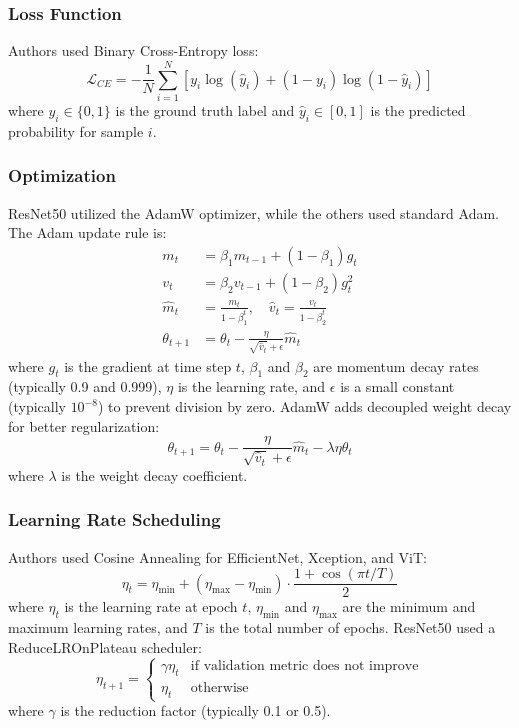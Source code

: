 \documentclass[runningheads]{llncs}
\begin{document}
\subsubsection{Loss Function}
Authors used Binary Cross-Entropy loss:
\begin{equation}
\mathcal{L}_{CE} = -\frac{1}{N}\sum_{i=1}^{N}\left[y_i \log(\hat{y}_i) + (1-y_i)\log(1-\hat{y}_i)\right]
\label{eq:cross_entropy}
\end{equation}
where $y_i \in \{0,1\}$ is the ground truth label and $\hat{y}_i \in [0,1]$ is the predicted probability for sample $i$.

\subsubsection{Optimization}
ResNet50 utilized the AdamW optimizer, while the others used standard Adam. The Adam update rule is:
\begin{align}
m_t &= \beta_1 m_{t-1} + (1-\beta_1) g_t \\
v_t &= \beta_2 v_{t-1} + (1-\beta_2) g_t^2 \\
\hat{m}_t &= \frac{m_t}{1-\beta_1^t}, \quad \hat{v}_t = \frac{v_t}{1-\beta_2^t} \\
\theta_{t+1} &= \theta_t - \frac{\eta}{\sqrt{\hat{v}_t} + \epsilon}\hat{m}_t
\label{eq:adam}
\end{align}
where $g_t$ is the gradient at time step $t$, $\beta_1$ and $\beta_2$ are momentum decay rates (typically 0.9 and 0.999), $\eta$ is the learning rate, and $\epsilon$ is a small constant (typically $10^{-8}$) to prevent division by zero. AdamW adds decoupled weight decay for better regularization:
\begin{equation}
\theta_{t+1} = \theta_t - \frac{\eta}{\sqrt{\hat{v}_t} + \epsilon}\hat{m}_t - \lambda \eta \theta_t
\label{eq:adamw}
\end{equation}
where $\lambda$ is the weight decay coefficient.

\subsubsection{Learning Rate Scheduling}
Authors used Cosine Annealing for EfficientNet, Xception, and ViT:
\begin{equation}
\eta_t = \eta_{\min} + (\eta_{\max} - \eta_{\min}) \cdot \frac{1 + \cos(\pi t / T)}{2}
\label{eq:cosine_annealing}
\end{equation}
where $\eta_t$ is the learning rate at epoch $t$, $\eta_{\min}$ and $\eta_{\max}$ are the minimum and maximum learning rates, and $T$ is the total number of epochs. ResNet50 used a ReduceLROnPlateau scheduler:
\begin{equation}
\eta_{t+1} = \begin{cases}
\gamma \eta_t & \text{if validation metric does not improve} \\
\eta_t & \text{otherwise}
\end{cases}
\label{eq:plateau}
\end{equation}
where $\gamma$ is the reduction factor (typically 0.1 or 0.5).
\end{document}
